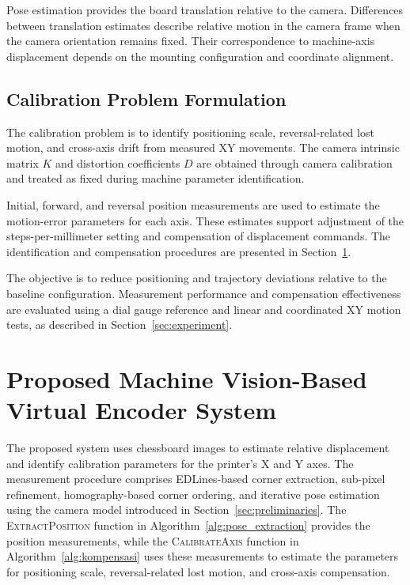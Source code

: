 \documentclass[journal]{IEEEtran}
\begin{document}
Pose estimation provides the board translation
relative to the camera. Differences between
translation estimates describe relative motion
in the camera frame when the camera orientation
remains fixed. Their correspondence to machine-axis
displacement depends on the mounting configuration
and coordinate alignment.

\subsection{Calibration Problem Formulation}

The calibration problem is to identify positioning
scale, reversal-related lost motion, and cross-axis
drift from measured XY movements.
The camera intrinsic matrix $K$ and distortion
coefficients $D$ are obtained through camera
calibration and treated as fixed during machine
parameter identification.

Initial, forward, and reversal position measurements
are used to estimate the motion-error parameters
for each axis. These estimates support adjustment
of the steps-per-millimeter setting and compensation
of displacement commands.
The identification and compensation procedures
are presented in Section~\ref{sec:proposed_encoder}.

The objective is to reduce positioning and trajectory
deviations relative to the baseline configuration.
Measurement performance and compensation effectiveness
are evaluated using a dial gauge reference and
linear and coordinated XY motion tests,
as described in Section~\ref{sec:experiment}.



\section{Proposed Machine Vision-Based Virtual Encoder System}
\label{sec:proposed_encoder}

The proposed system uses chessboard images to estimate
relative displacement and identify calibration parameters
for the printer's X and Y axes. The measurement procedure
comprises EDLines-based corner extraction, sub-pixel
refinement, homography-based corner ordering, and
iterative pose estimation using the camera model
introduced in Section~\ref{sec:preliminaries}.
The \textsc{ExtractPosition} function in
Algorithm~\ref{alg:pose_extraction} provides the position
measurements, while the \textsc{CalibrateAxis} function
in Algorithm~\ref{alg:kompensasi} uses these measurements
to estimate the parameters for positioning scale,
reversal-related lost motion, and cross-axis compensation.
\end{document}
